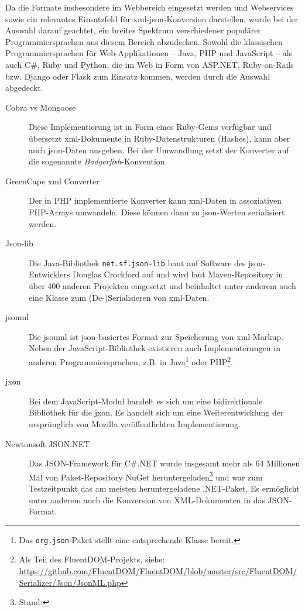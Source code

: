 Da die Formate insbesondere im Webbereich eingesetzt werden und Webservices sowie  ein relevantes Einsatzfeld für \acrshort{xml}-\acrshort{json}-Konversion darstellen, wurde bei der Auswahl darauf geachtet, ein breites Spektrum verschiedener populärer Programmiersprachen aus diesem Bereich abzudecken. Sowohl die klassischen Programmiersprachen für Web-Applikationen --  Java, PHP und JavaScript -- als auch C\#, Ruby und Python, die im Web in Form von ASP.NET, Ruby-on-Rails bzw. Django oder Flask zum Einsatz kommen, werden durch die Auswahl abgedeckt.

\begin{description}
    \item[Cobra vs Mongoose] Diese Implementierung ist in Form eines Ruby-Gems verfügbar und übersetzt \acrshort{xml}-Dokumente in Ruby-Datenstrukturen (Hashes), kann aber auch \acrshort{json}-Daten ausgeben. Bei der Umwandlung setzt der  Konverter auf die sogenannte \emph{Badgerfish}-Konvention.
    \item[GreenCape \acrshort{xml} Converter] Der in PHP implementierte Konverter kann \acrshort{xml}-Daten in asso\-ziativen PHP-Arrays umwandeln. Diese können dann zu \acrshort{json}-Werten serialisiert werden.
    \item[Json-lib] Die Java-Bibliothek \texttt{net.sf.json-lib} baut auf Software des \acrshort{json}-Entwicklers Douglas Crockford auf und wird laut Maven-Repository in über 400 anderen Projekten eingesetzt und beinhaltet unter anderem auch eine Klasse zum (De-)Serialisieren von \acrshort{xml}-Daten.
    \item[{\acrshort{jsonml}}] Die \acrfull{jsonml} ist \acrshort{json}-basiertes Format zur Speicherung von \acrshort{xml}-Markup. Neben der JavaScript-Bibliothek existieren auch Implementerungen in anderen Programmiersprachen, z.B. in Java\footnote{Das \texttt{org.json}-Paket stellt eine entsprechende Klasse bereit.}  oder PHP\footnote{Als Teil des FluentDOM-Projekts, siehe: \url{https://github.com/FluentDOM/FluentDOM/blob/master/src/FluentDOM/Serializer/Json/JsonML.php}}.
    \item[{\acrshort{jxon}}] Bei dem JavaScript-Modul handelt es sich um eine bidirektionale Bibliothek für die \acrlong{jxon}. Es handelt sich um eine Weiterentwicklung der ursprünglich von Mozilla veröffentlichten Implementierung.
    \item[Newtonsoft JSON.NET] Das JSON-Framework für C\#.NET wurde insgesamt mehr als 64 Millionen Mal von Paket-Repository NuGet heruntergeladen\footnote{Stand: } und war zum Testzeitpunkt das am meisten heruntergeladene .NET-Paket. Es ermöglicht unter anderem auch die Konversion von XML-Dokumenten in das JSON-Format.

\end{description}
